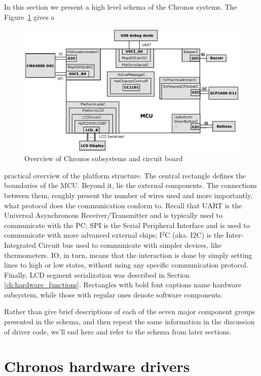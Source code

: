 In this section we present a high level schema of the Chronos systems. The Figure~\ref{fig:chronos_schema} gives a 
\begin{figure}[h]
  \centering
  \includegraphics[width=1.05\textwidth]{diagrams/chronos_schema.eps}
  \caption{Overview of Chronos subsystems and circuit board}
  \label{fig:chronos_schema}
\end{figure}
practical overview of the platform structure. The central rectangle defines the boundaries of the MCU. Beyond it, lie the external components. The connections between them, roughly present the number of wires used and more importantly, what protocol does the communication conform to. Recall that UART is the Universal Asynchronous Receiver/Transmitter and is typically used to communicate with the PC; SPI is the Serial Peripheral Interface and is used to communicate with more advanced external chips; I$^2$C (aka. I2C) is the Inter-Integrated Circuit bus used to communicate with simpler devices, like thermometers. IO, in turn, means that the interaction is done by simply setting lines to high or low states, without using any specific communication protocol. Finally, LCD segment serialization was described in Section \ref{ch:hardware_functions}. Rectangles with bold font captions name hardware subsystem, while those with regular ones denote software components.

Rather than give brief descriptions of each of the seven major component groups presented in the schema, and then repeat the same information in the discussion of driver code, we'll end here and refer to the schema from later sections.

\section{Chronos hardware drivers}

